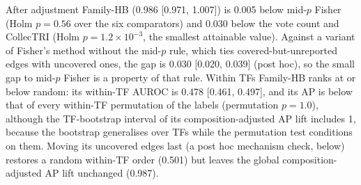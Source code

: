 \documentclass[11pt,a4paper]{article}
\begin{document}
After adjustment Family-HB (0.986 [0.971, 1.007]) is 0.005 below mid-$p$ Fisher (Holm $p=0.56$ over the six comparators) and 0.030 below the vote count and CollecTRI (Holm $p=\ensuremath{1.2\times10^{-3}}$, the smallest attainable value).
Against a variant of Fisher's method without the mid-$p$ rule, which ties covered-but-unreported edges with uncovered ones, the gap is 0.030 [0.020, 0.039] (post hoc), so the small gap to mid-$p$ Fisher is a property of that rule.
Within TFs Family-HB ranks at or below random: its within-TF AUROC is 0.478 [0.461, 0.497], and its AP is below that of every within-TF permutation of the labels (permutation $p=1.0$), although the TF-bootstrap interval of its composition-adjusted AP lift includes 1, because the bootstrap generalises over TFs while the permutation test conditions on them.
Moving its uncovered edges last (a post hoc mechanism check, below) restores a random within-TF order (0.501) but leaves the global composition-adjusted AP lift unchanged (0.987).
\end{document}
